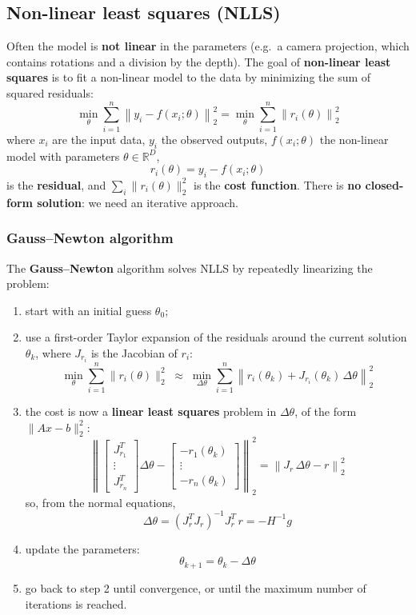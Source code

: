\subsection{Non-linear least squares (NLLS)}
Often the model is \textbf{not linear} in the parameters (e.g.\ a camera projection, which contains rotations and a division by the depth).
The goal of \textbf{non-linear least squares} is to fit a non-linear model to the data by minimizing the sum of squared residuals:
\[
\min_\theta \sum_{i=1}^{n} \left\| y_i - f(x_i; \theta) \right\|_2^2 = \min_\theta \sum_{i=1}^{n} \left\| r_i(\theta) \right\|_2^2
\]
where $x_i$ are the input data, $y_i$ the observed outputs, $f(x_i; \theta)$ the non-linear model with parameters $\theta \in \mathbb{R}^D$,
\[
r_i(\theta) = y_i - f(x_i; \theta)
\]
is the \textbf{residual}, and $\sum_i \|r_i(\theta)\|_2^2$ is the \textbf{cost function}.
There is \textbf{no closed-form solution}: we need an iterative approach.

\subsubsection{Gauss--Newton algorithm}
The \textbf{Gauss--Newton} algorithm solves NLLS by repeatedly linearizing the problem:
\begin{enumerate}
    \item start with an initial guess $\theta_0$;
    \item use a first-order Taylor expansion of the residuals around the current solution $\theta_k$, where $J_{r_i}$ is the Jacobian of $r_i$:
    \[
    \min_\theta \sum_{i=1}^{n} \|r_i(\theta)\|_2^2 \;\approx\; \min_{\Delta\theta} \sum_{i=1}^{n} \left\| r_i(\theta_k) + J_{r_i}(\theta_k)\, \Delta\theta \right\|_2^2
    \]
    \item the cost is now a \textbf{linear least squares} problem in $\Delta\theta$, of the form $\|Ax - b\|_2^2$:
    \[
    \left\| \begin{bmatrix} J_{r_1}^T \\ \vdots \\ J_{r_n}^T \end{bmatrix} \Delta\theta - \begin{bmatrix} -r_1(\theta_k) \\ \vdots \\ -r_n(\theta_k) \end{bmatrix} \right\|_2^2 = \left\| J_r\, \Delta\theta - r \right\|_2^2
    \]
    so, from the normal equations,
    \[
    \Delta\theta = (J_r^T J_r)^{-1} J_r^T\, r = -H^{-1} g
    \]
    \item update the parameters:
    \[
    \theta_{k+1} = \theta_k - \Delta\theta
    \]
    \item go back to step 2 until convergence, or until the maximum number of iterations is reached.
\end{enumerate}

